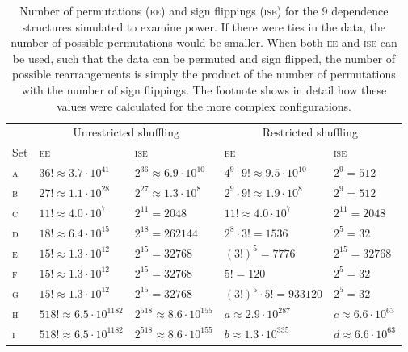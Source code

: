 \begin{table}[!tp]
\caption{Number of permutations (\textsc{ee}) and sign flippings (\textsc{ise}) for the 9 dependence structures simulated to examine power. If there were ties in the data, the number of possible permutations would be smaller. When both \textsc{ee} and \textsc{ise} can be used, such that the data can be permuted and sign flipped, the number of possible rearrangements is simply the product of the number of permutations with the number of sign flippings. The footnote shows in detail how these values were calculated for the more complex configurations.}
\begin{center}
{\small
\begin{tabular}{@{}m{10mm}<{\raggedright}
                   m{29mm}<{\raggedright}
                   m{28mm}<{\raggedright}
                   m{29mm}<{\raggedright}
                   m{23mm}<{\raggedright}@{}}
\toprule
{}        & \multicolumn{2}{c}{Unrestricted shuffling} & \multicolumn{2}{c}{Restricted shuffling}\\
\cmidrule(lr){2-3} \cmidrule(l){4-5}
Set & \textsc{ee} & \textsc{ise} & \textsc{ee} & \textsc{ise}\\
\midrule
\textsc{a} & $36! \approx 3.7 \cdot 10^{41}$ & $2^{36} \approx 6.9 \cdot 10^{10}$ & $4^9 \cdot 9! \approx 9.5 \cdot 10^{10} $ & $2^9=512$\\
\textsc{b} & $27! \approx 1.1 \cdot 10^{28}$ & $2^{27} \approx 1.3 \cdot 10^{8}$ & $2^9 \cdot 9! \approx 1.9 \cdot 10^{8} $ & $2^9=512$\\
\textsc{c} & $11! \approx 4.0 \cdot 10^{7}$ & $2^{11} = 2048$ & $11! \approx 4.0 \cdot 10^{7}$ & $2^{11} = 2048$\\
\textsc{d} & $18! \approx 6.4 \cdot 10^{15}$ & $2^{18} = 262144$ & $2^8 \cdot 3! = 1536$ & $2^5 = 32$\\
\textsc{e} & $15! \approx 1.3 \cdot 10^{12}$ & $2^{15} = 32768$ & $(3!)^5 = 7776$ & $2^{15} = 32768$\\
\textsc{f} & $15! \approx 1.3 \cdot 10^{12}$ & $2^{15} = 32768$ & $5! = 120$ & $2^5 = 32$\\
\textsc{g} & $15! \approx 1.3 \cdot 10^{12}$ & $2^{15} = 32768$ & $(3!)^5 \cdot 5! = 933120$ & $2^5 = 32$\\
\textsc{h} & $518! \approx 6.5 \cdot 10^{1182}$ & $2^{518} \approx 8.6 \cdot 10^{155}$ & $a \approx 2.9 \cdot 10^{287}$ & $c \approx 6.6 \cdot 10^{63}$\\
\textsc{i} & $518! \approx 6.5 \cdot 10^{1182}$ & $2^{518} \approx 8.6 \cdot 10^{155}$ & $b \approx 1.3 \cdot 10^{335}$ & $d \approx 6.6 \cdot 10^{63}$\\

\end{tabular}}
\end{center}
\end{table}
